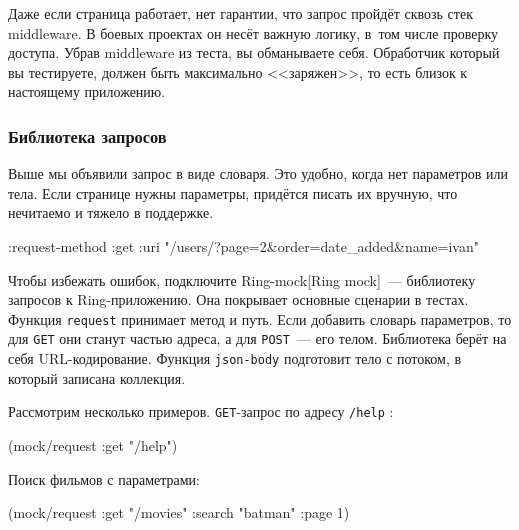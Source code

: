 Даже если страница работает, нет гарантии, что запрос пройдёт сквозь стек
middleware. В боевых проектах он несёт важную логику, в~том числе проверку
доступа. Убрав middleware из теста, вы обманываете себя. Обработчик который вы
тестируете, должен быть максимально <<заряжен>>, то есть близок к настоящему
приложению.

\subsubsection*{Библиотека запросов}

Выше мы объявили запрос в виде словаря. Это удобно, когда нет параметров или
тела. Если странице нужны параметры, придётся писать их вручную, что нечитаемо и
тяжело в поддержке.

\begin{english}
  \begin{clojure}
{:request-method :get
 :uri "/users/?page=2&order=date_added&name=ivan"}
  \end{clojure}
\end{english}


Чтобы избежать ошибок, подключите
Ring-mock[Ring mock]~--- библиотеку
запросов к Ring-приложению. Она покрывает основные сценарии в тестах. Функция
\verb|request| принимает метод и путь. Если добавить словарь параметров, то
для \verb|GET| они станут частью адреса, а для \verb|POST|~--- его
телом. Библиотека берёт на себя URL-кодирование. Функция \verb|json-body|
подготовит тело с потоком, в который записана коллекция.

Рассмотрим несколько примеров. \verb|GET|-запрос по адресу \verb|/help| :

\begin{english}
  \begin{clojure}
(mock/request :get "/help")
  \end{clojure}
\end{english}

\noindent
Поиск фильмов с параметрами:

\begin{english}
  \begin{clojure}
(mock/request :get "/movies" {:search "batman" :page 1})
  \end{clojure}
\end{english}


